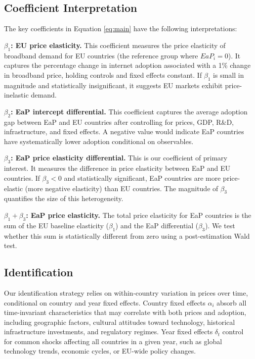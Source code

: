 \documentclass[12pt,review]{elsarticle}
\begin{document}
\subsection{Coefficient Interpretation}

The key coefficients in Equation \ref{eq:main} have the following interpretations:

\textbf{$\beta_1$: EU price elasticity.} This coefficient measures the price elasticity of broadband demand for EU countries (the reference group where $EaP_i = 0$). It captures the percentage change in internet adoption associated with a 1\% change in broadband price, holding controls and fixed effects constant. If $\beta_1$ is small in magnitude and statistically insignificant, it suggests EU markets exhibit price-inelastic demand.

\textbf{$\beta_2$: EaP intercept differential.} This coefficient captures the average adoption gap between EaP and EU countries after controlling for prices, GDP, R\&D, infrastructure, and fixed effects. A negative value would indicate EaP countries have systematically lower adoption conditional on observables.

\textbf{$\beta_3$: EaP price elasticity differential.} This is our coefficient of primary interest. It measures the difference in price elasticity between EaP and EU countries. If $\beta_3 < 0$ and statistically significant, EaP countries are more price-elastic (more negative elasticity) than EU countries. The magnitude of $\beta_3$ quantifies the size of this heterogeneity.

\textbf{$\beta_1 + \beta_3$: EaP price elasticity.} The total price elasticity for EaP countries is the sum of the EU baseline elasticity ($\beta_1$) and the EaP differential ($\beta_3$). We test whether this sum is statistically different from zero using a post-estimation Wald test.

\subsection{Identification}

Our identification strategy relies on within-country variation in prices over time, conditional on country and year fixed effects. Country fixed effects $\alpha_i$ absorb all time-invariant characteristics that may correlate with both prices and adoption, including geographic factors, cultural attitudes toward technology, historical infrastructure investments, and regulatory regimes. Year fixed effects $\delta_t$ control for common shocks affecting all countries in a given year, such as global technology trends, economic cycles, or EU-wide policy changes.
\end{document}
